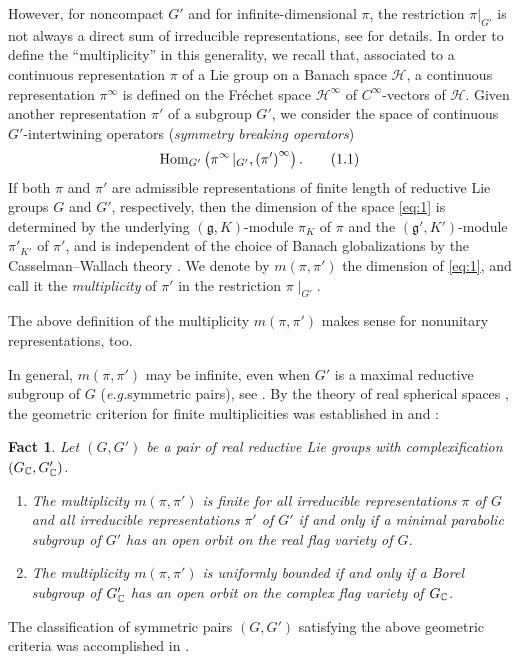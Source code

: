 \documentclass[reqno,12pt]{pja00} %
\newcommand{\Hom}{\mbox{\normalfont Hom}}
\newtheorem{fact}[theorem]{Fact}
\theoremstyle{definition}
\theoremstyle{exampstyle} \newtheorem{examp}[theorem]{Theorem}
\begin{document}
However, 
for noncompact $G'$ and for infinite-dimensional $\pi$,
the restriction $\pi|_{G'}$
is not always a direct sum of irreducible representations, see \cite{kobayashi1998discrete2,
kobayashi1998discrete3} for details.
In order to define the ``multiplicity'' in this generality, we recall that, associated to a continuous representation $\pi$ of a Lie group on a Banach space $\mathcal{H}$, 
a continuous representation $\pi^\infty$ is defined on the Fr\'echet space $\mathcal{H}^\infty$ of $C^\infty$-vectors of $\mathcal{H}$.
Given another representation $\pi'$ of a subgroup $G'$, we consider the space of continuous $G'$-intertwining operators ({\it symmetry breaking operators})
\begin{equation}\label{eq:1}
	\Hom_{G'}\left( \pi^\infty\!\mid_{G'}, \left( \pi' \right)^\infty\right).\tag{1.1}
\end{equation}
If both $\pi$ and $\pi'$ are admissible representations of finite 
length of reductive Lie groups $G$ and $G'$, respectively, then the dimension of the space \eqref{eq:1} is determined by the underlying
$(\mathfrak{g},K)$-module $\pi_K$ of $\pi$ and the $(\mathfrak{g}',K')$-module $\pi'_{K'}$ of $\pi'$, and is independent of the choice of Banach globalizations by the 
Casselman--Wallach theory
\cite[Chap.\ 11]{wallach1988real2}. We denote by $m(\pi,\pi')$ the dimension of \eqref{eq:1}, and call it the {\it multiplicity} of $\pi'$ in the restriction $\pi\!\mid_{G'}$.

The above definition of the multiplicity $m(\pi,\pi')$ makes sense 
for nonunitary representations, too. 

In general, $m(\pi,\pi')$ may be infinite, even when $G'$ is a 
maximal reductive subgroup of $G$
({\it e.g.}\;symmetric pairs), see \cite{Kobayashi2014}.
By the theory of real spherical spaces \cite{kobayashi2013finite}, the geometric criterion for finite multiplicities was established in \cite{Kobayashi2014} and \cite{kobayashi2013finite}:

\begin{fact}\label{fact:1} Let $(G,G')$ be a pair of real reductive Lie groups with complexification $(G_{\mathbb{C}},G'_{\mathbb{C}})$.
	\begin{enumerate}[(1)]
		\item The multiplicity $m(\pi,\pi')$ is finite for all irreducible representations $\pi$ of $G$ and all irreducible representations $\pi'$ of $G'$ if and only if
			a minimal parabolic subgroup of $G'$ has an open orbit on the real flag variety of $G$.
		\item The multiplicity $m(\pi,\pi')$ is uniformly bounded if and only if a Borel subgroup of $G_{\mathbb{C}}'$ has an open orbit on the complex flag variety of $G_{\mathbb{C}}$.
	\end{enumerate}
\end{fact}
The classification of symmetric pairs $(G, G')$ satisfying the above geometric criteria
was accomplished in \cite{kobayashi2014classification}.
\end{document}
